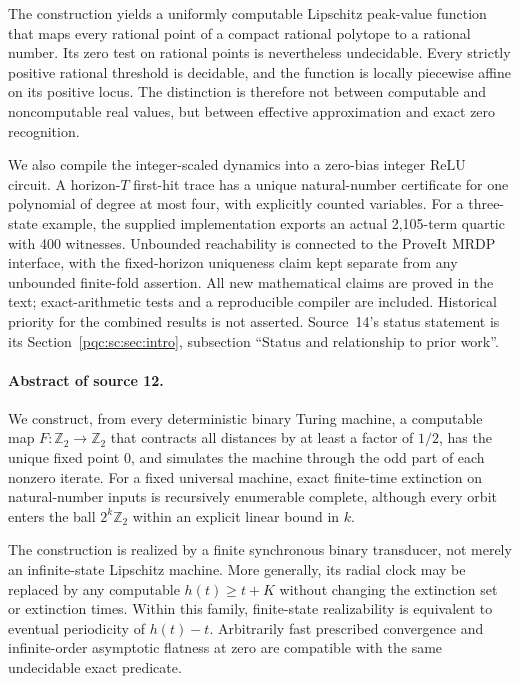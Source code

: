 \documentclass[11pt,letterpaper]{article}
\numberwithin{equation}{section}
\theoremstyle{definition}
\theoremstyle{remark}
\newcommand{\Ztwo}{\mathbb Z_2}
\begin{document}
The construction yields a uniformly computable Lipschitz peak-value function
that maps every rational point of a compact rational polytope to a rational
number. Its zero test on rational points is nevertheless undecidable.
Every strictly positive rational threshold is decidable, and the function is
locally piecewise affine on its positive locus. The distinction is therefore
not between computable and noncomputable real values, but between effective
approximation and exact zero recognition.

We also compile the integer-scaled dynamics into a zero-bias integer ReLU
circuit. A horizon-$T$ first-hit trace has a unique natural-number certificate
for one polynomial of degree at most four, with explicitly counted variables.
For a three-state example, the supplied implementation exports an actual
2,105-term quartic with 400 witnesses. Unbounded reachability is connected to
the ProveIt MRDP interface, with the fixed-horizon uniqueness claim kept
separate from any unbounded finite-fold assertion. All new mathematical claims
are proved in the text; exact-arithmetic tests and a reproducible compiler are
included. Historical priority for the combined results is not asserted.
Source~14's status statement is its Section~\ref{pqc:sc:sec:intro},
subsection ``Status and relationship to prior work''.
\paragraph{Abstract of source 12.}
We construct, from every deterministic binary Turing machine, a computable map
$F\colon\Ztwo\to\Ztwo$ that contracts all distances by at least a factor of
$1/2$, has the unique fixed point $0$, and simulates the machine through the
odd part of each nonzero iterate. For a fixed universal machine, exact
finite-time extinction on natural-number inputs is recursively enumerable
complete, although every orbit enters the ball $2^k\Ztwo$ within an explicit
linear bound in $k$.

The construction is realized by a finite synchronous binary transducer,
not merely an infinite-state Lipschitz machine. More generally, its radial
clock may be replaced by any computable $h(t)\ge t+K$ without changing the
extinction set or extinction times. Within this family, finite-state
realizability is equivalent to eventual periodicity of $h(t)-t$. Arbitrarily
fast prescribed convergence and infinite-order asymptotic flatness at zero
are compatible with the same undecidable exact predicate.
\end{document}
